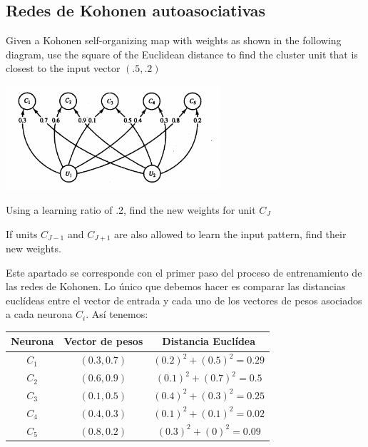 \subsection{Redes de Kohonen autoasociativas}
\begin{problem}[2]\label{ej:kohonenGraph}
\ppart  Given a Kohonen self-organizing map with weights as shown in the following
diagram, use the square of the Euclidean distance to find the cluster unit that
is closest to the input vector $(.5,.2)$
\begin{center}
\includegraphics[width=0.6\textwidth]{img/figure4-2.png}
\end{center}

\ppart
Using a learning ratio of .2, find the new weights for unit $C_J$

\ppart If units $C_{J-1}$ and $C_{J+1}$ are also allowed to learn the input pattern, find their new weights.
\solution

\spart

Este apartado se corresponde con el primer paso del proceso de entrenamiento de las redes de Kohonen. Lo único que debemos hacer es comparar las distancias euclídeas entre el vector de entrada y cada uno de los vectores de pesos asociados a cada neurona $C_i$. Así tenemos:

\begin{center}
\begin{tabular}{|c|c|c|}
\hline
\textbf{Neurona}  & \textbf{Vector de pesos} & \textbf{Distancia Euclídea}\\
\hline
$C_1$ & $(0.3, 0.7)$ & $(0.2)^2 + (0.5)^2 = 0.29$\\
$C_2$ & $(0.6, 0.9)$ & $(0.1)^2 + (0.7)^2 = 0.5$\\
$C_3$ & $(0.1, 0.5)$ & $(0.4)^2 + (0.3)^2 = 0.25$\\
$C_4$ & $(0.4, 0.3)$ & $(0.1)^2 + (0.1)^2 = 0.02$\\
$C_5$ & $(0.8, 0.2)$ & $(0.3)^2 + (0)^2 = 0.09$\\
\hline
\end{tabular}
\end{center}


\end{problem}
